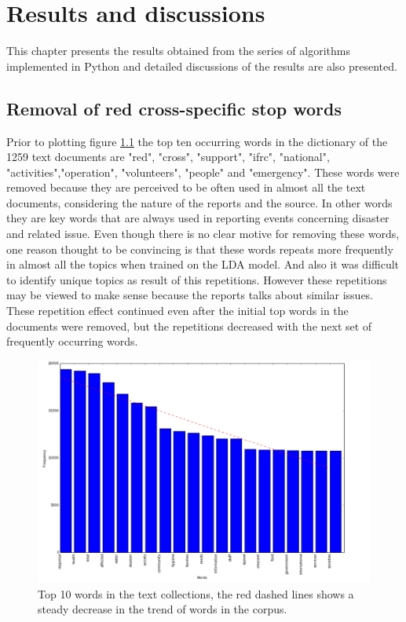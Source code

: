 \chapter{Results and discussions}
This chapter presents the results obtained from the series of algorithms implemented in Python and detailed discussions of the results are also presented. 
\section{Removal of red cross-specific stop words}
Prior to plotting figure \ref{Fig. 4.1} the top ten occurring words in the dictionary of the 1259 text documents are "red", "cross",  "support", "ifrc", "national", "activities","operation", "volunteers", "people" and "emergency". These words were removed because they are perceived  to be often used in almost all the text documents, considering the nature of the reports and the source. In other words they are key words that are always used in reporting events concerning disaster and  related issue. Even though there is no clear motive for removing these words, one reason thought to be convincing is that these words repeats more frequently in almost all the topics when trained on the LDA model. And also it was difficult to identify unique topics as result of this repetitions. However these repetitions may be viewed to make sense because the reports talks about similar issues. These repetition effect continued even after the initial top words in the documents were removed, but the repetitions decreased with the next set of frequently occurring words.
\begin{figure}[hbtp]
\centering
\includegraphics[scale=0.35]{c4_1_orig.png}
\caption{Top 10 words  in the text collections, the red dashed lines shows a steady decrease in the trend of words in the corpus.}\label{Fig. 4.1}
\end{figure}
 
